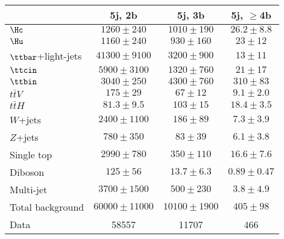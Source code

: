 \begin{table}[htbp]
\begin{center}
\begin{tabular}{l*{3}{c}}
\hline\hline
 & 5j, 2b & 5j, 3b & 5j, $\geq$4b \\
\hline
$\Hc$ & $ 1260 \pm 240 $ &   $ 1010 \pm 190 $ &   $ 26.2 \pm 8.8 $ \\ 
$\Hu$ & $ 1160 \pm 240 $ &   $ 930 \pm 160 $ &   $ 23 \pm 12 $ \\ 
\hline
$\ttbar$+light-jets & $ 41300 \pm 9100 $ &   $ 3200 \pm 900 $ &   $ 13 \pm 11 $ \\ 
$\ttcin$ & $ 5900 \pm 3100 $ &   $ 1320 \pm 760 $ &   $ 21 \pm 17 $ \\ 
$\ttbin$ & $ 3040 \pm 250 $ &   $ 4300 \pm 760 $ &   $ 310 \pm 83 $ \\ 
$t\bar{t}V$  &   $ 175 \pm 29 $ &   $ 67 \pm 12 $ &   $ 9.1 \pm 2.0 $ \\ 
$t\bar{t}H$  &   $ 81.3 \pm 9.5 $ &   $ 103 \pm 15 $ &   $ 18.4 \pm 3.5 $ \\ 
$W$+jets  &   $ 2400 \pm 1100 $ &   $ 186 \pm 89 $ &   $ 7.3 \pm 3.9 $ \\ 
$Z$+jets  &   $ 780 \pm 350 $ &   $ 83 \pm 39 $ &   $ 6.1 \pm 3.8 $ \\ 
Single top  &   $ 2990 \pm 780 $ &   $ 350 \pm 110 $ &   $ 16.6 \pm 7.6 $ \\ 
Diboson  &   $ 125 \pm 56 $ &   $ 13.7 \pm 6.3 $ &   $ 0.89 \pm 0.47 $ \\ 
Multi-jet  &   $ 3700 \pm 1500 $ &   $ 500 \pm 230 $ &   $ 3.8 \pm 4.9 $ \\ 
\hline
Total background &  $ 60000 \pm 11000 $ &   $ 10100 \pm 1900 $ &   $ 405 \pm 98 $ \\
\hline
Data & 58557  & 11707  & 466  \\ 
\hline\hline    
\end{tabular}
\vspace{0.2cm}


\end{center}
\end{table}
